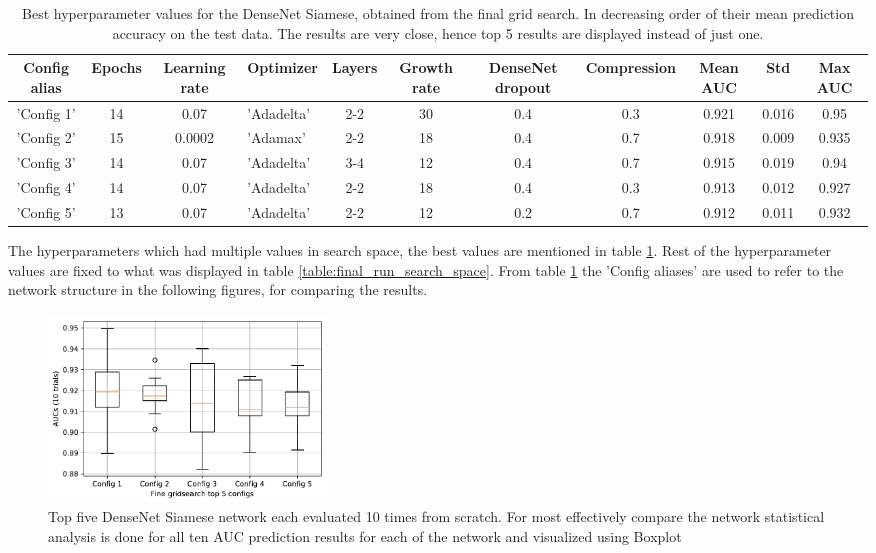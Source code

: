 \begin{table}[ht]
\centering
\caption[Best hyperparameter values for the DenseNet Siamese ...]{Best hyperparameter values for the DenseNet Siamese, obtained from the final grid search. In decreasing order of their mean prediction accuracy on the test data. 
The results are very close, hence top 5 results are displayed instead of just one.}
\resizebox{\textwidth}{!}
{\begin{tabular}{|c c c l c c c c c c c|} 
 \hline\hline
 \rowcolor{lightgrey}
\textbf{Config alias} & \textbf{Epochs} & \textbf{Learning rate} & \textbf{Optimizer} & \textbf{Layers} & \textbf{Growth rate} & \textbf{DenseNet dropout} & \textbf{Compression} & \textbf{Mean AUC} & \textbf{Std} & \textbf{Max AUC}\\
\hline
'Config 1' &  14 &  0.07 &  'Adadelta' &  2-2 &  30 &  0.4 &  0.3 &  0.921 &  0.016 &  0.95 \\
'Config 2' &  15 &  0.0002 &  'Adamax' &  2-2 &  18 &  0.4 &  0.7 &  0.918 &  0.009 &  0.935\\
'Config 3' &  14 &  0.07 &  'Adadelta' &  3-4 &  12 &  0.4 &  0.7 &  0.915 &  0.019 &  0.94\\
'Config 4' &  14 &  0.07 &  'Adadelta' &  2-2 &  18 &  0.4 &  0.3 &  0.913 &  0.012 &  0.927\\
'Config 5' &  13 &  0.07 &  'Adadelta' &  2-2 &  12 &  0.2 &  0.7 &  0.912 &  0.011 &  0.932\\
 \hline \hline
\end{tabular}}
\label{table:final_run_best_configs}
\end{table}

\flushbottom
\newpage
The hyperparameters which had multiple values in search space, the best values are mentioned in table \ref{table:final_run_best_configs}. Rest of the hyperparameter values are fixed to what was displayed in table \ref{table:final_run_search_space}. 
From table \ref{table:final_run_best_configs} the 'Config aliases' are used to refer to the network structure in the following figures, for comparing the results.

\begin{figure}[ht]
\centering
\includegraphics[height= 5cm]{images/densenet/siamese/top_config_boxplot}
\caption[Boxplot visualization of top five DenseNet Siamese network]{Top five DenseNet Siamese network each evaluated 10 times from scratch. For most effectively compare the network statistical analysis is done for all ten AUC prediction results
for each of the network and visualized using Boxplot}
\label{fig:fine_grid_search_top_configs}
\end{figure}

